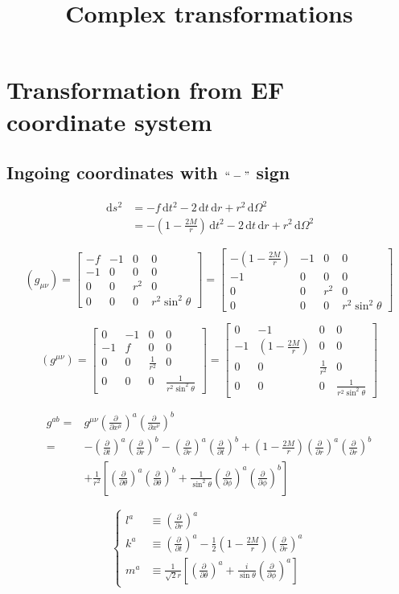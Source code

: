 \documentclass{article}
\title{Complex transformations}
\newcommand{\be}{\begin{equation}}
\newcommand{\ee}{\end{equation}}
\newcommand{\ba}{\begin{array}}
\newcommand{\ea}{\end{array}}
\newcommand{\dif}{\,\mathrm{d}}
\newcommand{\p}{\partial}
\newcommand{\1}{\left}
\newcommand{\2}{\right}
\begin{document}
\maketitle

\section{Transformation from EF coordinate system}
\subsection{Ingoing coordinates with $``-"$ sign}
\be 
\begin{split}
\dif s^2&=-f\dif t^2-2\dif t\dif r+r^2\dif\Omega^2\\
&=-(1-\frac{2M}{r})\dif t^2-2\dif t\dif r+r^2\dif\Omega^2
\end{split}
\ee


\be
(g_{\mu\nu})=\left[\ba{cccc}-f&-1&0&0\\-1&0&0&0\\0&0&r^2&0\\0&0&0&r^2\sin^2\theta\ea\right]=\left[\ba{cccc}-(1-\frac{2M}{r})&-1&0&0\\-1&0&0&0\\0&0&r^2&0\\0&0&0&r^2\sin^2\theta\ea\right]
\ee

\be
(g^{\mu\nu})=\left[\ba{cccc}0&-1&0&0\\-1&f&0&0\\0&0&\frac 1 {r^2}&0\\0&0&0&\frac 1 {r^2\sin^2\theta}\ea\right]=\left[\ba{cccc}0&-1&0&0\\-1&(1-\frac{2M}{r})&0&0\\0&0&\frac 1 {r^2}&0\\0&0&0&\frac 1 {r^2\sin^2\theta}\ea\right]
\ee

\be
\begin{split}
g^{ab} =& g^{\mu\nu}\1(\frac \p {\p x^\mu}\2)^a\1(\frac \p {\p x^\nu}\2)^b\\
=& -\1(\frac \p {\p t}\2)^a\1(\frac \p {\p r}\2)^b-\1(\frac \p {\p r}\2)^a\1(\frac \p {\p t}\2)^b+\1(1-\frac{2M}{r}\2)\1(\frac \p {\p r}\2)^a\1(\frac \p {\p r}\2)^b \\
 & +\frac 1 {r^2} \1[\1(\frac \p {\p\theta}\2)^a \1(\frac \p {\p\theta}\2)^b+\frac 1 {\sin^2 \theta} \1(\frac \p {\p\phi}\2)^a \1(\frac \p {\p\phi}\2)^b \2] 
\end{split}
\ee

\be
\1\{
\begin{split}
l^a&\equiv \1(\frac \p {\p r}\2)^a\\
k^a&\equiv \1(\frac \p {\p t}\2)^a-\frac 1 2 \1(1-\frac{2M}{r}\2)\1(\frac \p {\p r}\2)^a\\
m^a&\equiv \frac 1 {\sqrt 2 r}\1[\1(\frac \p {\p\theta}\2)^a+\frac i {\sin\theta} \1(\frac \p {\p\phi}\2)^a\2]
\end{split}
\2.
\ee
\end{document}
